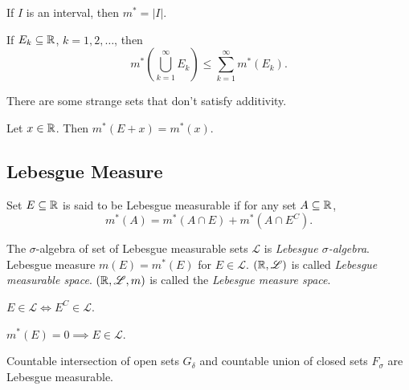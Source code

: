 \documentclass[class=book, crop=false]{standalone}
\begin{document}
        \begin{theorem}
            If $I$ is an interval, then $m^* = |I|$.
        \end{theorem}

        \begin{theorem}[Subadditivity]
            If $E_k \subseteq \mathbb{R}$, $k = 1, 2, \dots$, then
            \begin{equation*}
                m^*\left(\bigcup^{\infty}_{k = 1} E_k\right) \leq \sum^{\infty}_{k = 1} m^*(E_k).
            \end{equation*}
        \end{theorem}
        \begin{remark}
            There are some strange sets that don't satisfy additivity.
        \end{remark}

        \begin{theorem}
            Let $x \in \mathbb{R}$. Then $m^*(E + x) = m^*(x)$.
        \end{theorem}

        \subsection{Lebesgue Measure}
        \begin{definition}
            Set $E \subseteq \mathbb{R}$ is said to be Lebesgue measurable if for any set $A \subseteq \mathbb{R}$,
            \begin{equation*}
                m^*(A) = m^*(A \cap E) + m^*(A \cap E^C).
            \end{equation*}
        \end{definition}

        \begin{definition}
            The $\sigma$-algebra of set of Lebesgue measurable sets $\mathscr{L}$ is \textit{Lebesgue $\sigma$-algebra}. Lebesgue measure $m(E) = m^*(E)$ for $E \in \mathscr{L}$. $(\mathbb{R}, \mathscr{L})$ is called \textit{Lebesgue measurable space}. $(\mathbb{R}, \mathscr{L}, m)$ is called the \textit{Lebesgue measure space}.
        \end{definition}
        
        \begin{theorem}
            $E \in \mathscr{L} \Leftrightarrow E^C \in \mathscr{L}$.
        \end{theorem}

        \begin{theorem}
            $m^*(E) = 0 \implies E \in \mathscr{L}$.
        \end{theorem}
        \begin{remark}
            Countable intersection of open sets $G_{\delta}$ and countable union of closed sets $F_{\sigma}$ are Lebesgue measurable.
        \end{remark}
\end{document}
